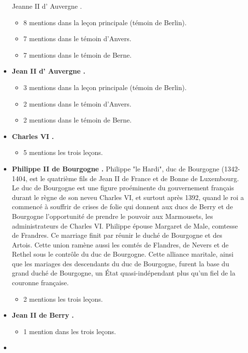 \documentclass[12pt, a4paper]{article}
\begin{document}
\begin{itemize}
{{				Jeanne
				II
				d'
				Auvergne
				.}  \begin{itemize} \item{8 mentions dans la leçon principale (témoin de Berlin).}  \item{7 mentions dans le témoin d'Anvers.}  \item{7 mentions dans le témoin de Berne.}  \end{itemize}}  \item{\textbf{
				Jean
				II
				d'
				Auvergne
				.}  \begin{itemize} \item{3 mentions dans la leçon principale (témoin de Berlin).}  \item{2 mentions dans le témoin d'Anvers.}  \item{2 mentions dans le témoin de Berne.}  \end{itemize}}  \item{\textbf{
				Charles
				VI
				.}  \begin{itemize} \item{5 mentions les trois leçons.}  \end{itemize}}  \item{\textbf{
				Philippe
				II
				de
				Bourgogne
				.} Philippe "le Hardi", duc de Bourgogne (1342-1404, est le quatrième fils de Jean II de France
			et de Bonne de Luxembourg. Le duc de Bourgogne est une figure proéminente du gouvernement français durant le règne de son neveu Charles VI,
			et surtout après 1392, quand le roi a commencé à souffrir de crises de folie qui donnent aux ducs de Berry et de Bourgogne l'opportunité de prendre
			le pouvoir aux Marmousets, les administrateurs de Charles VI. Philippe épouse Margaret de Male, comtesse de Frandres. Ce marriage finit par réunir le duché 
			de Bourgogne et des Artois. Cette union ramène aussi les comtés de Flandres, de Nevers et de Rethel sous le contrôle du duc de Bourgogne. Cette alliance 
			maritale, ainsi que les mariages des descendants du duc de Bourgogne, furent la base du grand duché de Bourgogne, un État quasi-indépendant plus qu'un fiel de la couronne française. \begin{itemize} \item{2 mentions les trois leçons.}  \end{itemize}}  \item{\textbf{
				Jean
				II
				de
				Berry
				.}  \begin{itemize} \item{1 mention dans les trois leçons.}  \end{itemize}}  \item{\textbf{
}}
\end{itemize}
\end{document}
